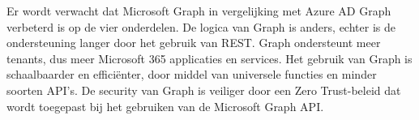 \begin{comment}

Hier beschrijf je welke resultaten je verwacht. Als je metingen en simulaties uitvoert, kan je hier al mock-ups maken van de grafieken samen met de verwachte conclusies. Benoem zeker al je assen en de onderdelen van de grafiek die je gaat gebruiken. Dit zorgt ervoor dat je concreet weet welk soort data je moet verzamelen en hoe je die moet meten.

Wat heeft de doelgroep van je onderzoek aan het resultaat? Op welke manier zorgt jouw bachelorproef voor een meerwaarde?

Hier beschrijf je wat je verwacht uit je onderzoek, met de motivatie waarom. Het is \textbf{niet} erg indien uit je onderzoek andere resultaten en conclusies vloeien dan dat je hier beschrijft: het is dan juist interessant om te onderzoeken waarom jouw hypothesen niet overeenkomen met de resultaten.



Er wordt verwacht dat alle niet Microsoft-\newline{}gerelateerde Infrastructure Automation tools de nodige Azure configuraties kunnen opzetten voor een testomgeving. Hoewel Ansible en Terraform een opmerkelijk beter potentieel hebben ten opzichte van de andere tools. Dit gaat gepaard met meer mogelijkheden binnen Azure. In vergelijking met de andere tools, zitten Ansible en Terraform in een continue ontwikkelingscyclus door het jonge toetreden tot de IT-sector. Beide tools scoren goed op vlak van logica, leesbaarheid, documentatie, community en limieten. In tegenstelling tot de andere tools die eerder op vlak van verwerkingssnelheid domineren. 

Vervolgens wordt er uit het onderzoek verwacht dat het automatiseren van Azure configuraties alleen maar voordelen heeft. Het enige nadeel in verband met de Infrastructure Automation tools is het leerproces om de tools onder de knie te hebben. Toch wordt dit ook als een voordeel gezien, omwille de tools buiten Azure populair zijn en ondersteund worden. Door het gebruik van deze automatisatie wordt de efficiëntie aanzienlijk verhoogd. Vervolgens biedt het de mogelijkheid tot Disaster Recovery aan. Daarbovenop is de kans tot menselijke fouten opmerkelijk verkleind.

\end{comment}

Er wordt verwacht dat Microsoft Graph in vergelijking met Azure AD Graph verbeterd is op de vier onderdelen. De logica van Graph is anders, echter is de ondersteuning langer door het gebruik van REST. Graph ondersteunt meer tenants, dus meer Microsoft 365 applicaties en services. Het gebruik van Graph is schaalbaarder en efficiënter, door middel van universele functies en minder soorten API’s. De security van Graph is veiliger door een Zero Trust-beleid dat wordt toegepast bij het gebruiken van de Microsoft Graph API.

